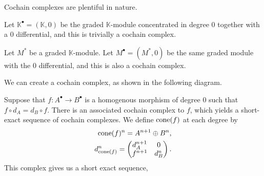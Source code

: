 \documentclass[../thesis.tex]{subfiles}
\begin{document}
            Cochain complexes are plentiful in nature.
            \begin{example}
                Let $\mathbb{K}^\bullet = (\mathbb{K}, 0)$ be the graded $\mathbb{K}$-module concentrated in degree $0$ together with a $0$ differential, and this is trivially a cochain complex.
            \end{example}
            \begin{example}
                Let $M^*$ be a graded $\mathbb{K}$-module. Let $M^\bullet = (M^*, 0)$ be the same graded module with the $0$ differential, and this is also a cochain complex.
            \end{example}
            \begin{example}
                We can create a cochain complex, as shown in the following diagram.
                \begin{center}
                \end{center}
            \end{example}
            \begin{example}
                Suppose that $f : A^\bullet \rightarrow B^\bullet$ is a homogenous morphism of degree $0$ such that $f\circ d_A = d_B\circ f$. There is an associated cochain complex to $f$, which yields a short-exact sequence of cochain complexes. We define $\tt{cone}(f)$ at each degree by
                \begin{align*}
                    \tt{cone}(f)^n = A^{n+1} \oplus B^{n}\tt{,} \\
                    d_{\tt{cone}(f)}^n = \begin{pmatrix}
                        d_A^{n+1} & 0 \\ f^{n+1} & d_B^n
                    \end{pmatrix}\tt{.}
                \end{align*}
                This complex gives us a short exact sequence,
                \begin{center}
                \end{center}
            \end{example}
\end{document}
